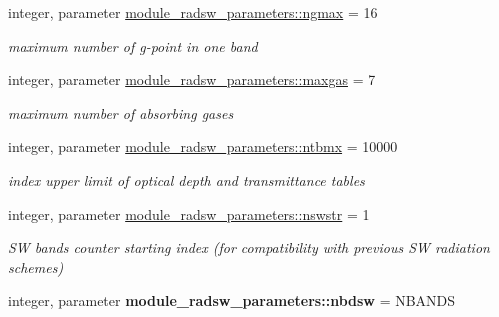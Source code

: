 \begin{DoxyCompactItemize}
\mbox{\label{namespacemodule__radsw__parameters_a0ba0ff5c18d3303a852d88687b4b5ca9}} 
integer, parameter \hyperlink{namespacemodule__radsw__parameters_a0ba0ff5c18d3303a852d88687b4b5ca9}{module\+\_\+radsw\+\_\+parameters\+::ngmax} = 16
\begin{DoxyCompactList}\small\item\em maximum number of g-\/point in one band \end{DoxyCompactList}\item 
\mbox{\label{namespacemodule__radsw__parameters_a5bc6fbb4231281a604352eec6b8e2bfc}} 
integer, parameter \hyperlink{namespacemodule__radsw__parameters_a5bc6fbb4231281a604352eec6b8e2bfc}{module\+\_\+radsw\+\_\+parameters\+::maxgas} = 7
\begin{DoxyCompactList}\small\item\em maximum number of absorbing gases \end{DoxyCompactList}\item 
\mbox{\label{namespacemodule__radsw__parameters_a4bd72558be40bfccfb78c48e640acd07}} 
integer, parameter \hyperlink{namespacemodule__radsw__parameters_a4bd72558be40bfccfb78c48e640acd07}{module\+\_\+radsw\+\_\+parameters\+::ntbmx} = 10000
\begin{DoxyCompactList}\small\item\em index upper limit of optical depth and transmittance tables \end{DoxyCompactList}\item 
\mbox{\label{namespacemodule__radsw__parameters_a3d4238ce9a40d70a6cdfe241d640ff5f}} 
integer, parameter \hyperlink{namespacemodule__radsw__parameters_a3d4238ce9a40d70a6cdfe241d640ff5f}{module\+\_\+radsw\+\_\+parameters\+::nswstr} = 1
\begin{DoxyCompactList}\small\item\em SW bands counter starting index (for compatibility with previous SW radiation schemes) \end{DoxyCompactList}\item 
\mbox{\label{namespacemodule__radsw__parameters_ab1e121fde29dde00871e4a7d43be1ddb}} 
integer, parameter {\bfseries module\+\_\+radsw\+\_\+parameters\+::nbdsw} = N\+B\+A\+N\+DS
\end{DoxyCompactItemize}

